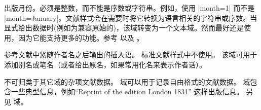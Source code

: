\begin{fieldlist}


出版月份。必须是整数，而不能是序数或字符串。例如，使用 |month={1}| 而不是 |month={January}|。文献样式会在需要时将它转换为语言相关的字符串或序数。当显式给出数据时(例如为兼容原始的\bibtex )，该域转变为一个文本域。然而最好还是使用，因为它能支持更多的功能。参考  以及 。




参考文献中紧随作者名之后输出的插入语。
标准文献样式中不使用。
该域可用于添加别名或笔名（或者给出原名，如果常用化名来表示作者话）。




不可归类于其它域的杂项文献数据。
 域可以用于记录自由格式的文献数据。
 域包含一些典型信息，例如“Reprint of the edition London 1831” 这样出版信息。
另见  域。




\end{fieldlist}
